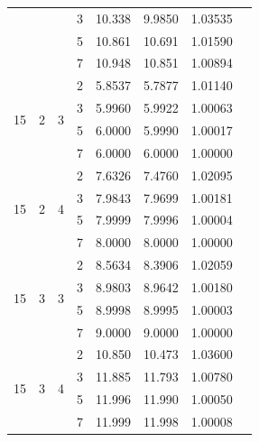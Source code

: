 \documentclass[a4paper,11pt,reqno]{article}
\theoremstyle{plain} \numberwithin{equation}{section}
\theoremstyle{definition}
\begin{document}
\begin{appendices}
\begin{table}[!ht]
\begin{tabular}{|c|c|c|c|c|c|c|c|}
                    &                    &                    & 3   & 10.338 & 9.9850 & 1.03535 \\
                    &                    &                    & 5   & 10.861 & 10.691 & 1.01590 \\
                    &                    &                    & 7   & 10.948 & 10.851 & 1.00894 \\
\hline
\multirow{4}{*}{15} & \multirow{4}{*}{2} & \multirow{4}{*}{3} & 2   & 5.8537 & 5.7877 & 1.01140 \\
                    &                    &                    & 3   & 5.9960 & 5.9922 & 1.00063 \\
                    &                    &                    & 5   & 6.0000 & 5.9990 & 1.00017 \\
                    &                    &                    & 7   & 6.0000 & 6.0000 & 1.00000 \\
\hline
\multirow{4}{*}{15} & \multirow{4}{*}{2} & \multirow{4}{*}{4} & 2   & 7.6326 & 7.4760 & 1.02095 \\
                    &                    &                    & 3   & 7.9843 & 7.9699 & 1.00181 \\
                    &                    &                    & 5   & 7.9999 & 7.9996 & 1.00004 \\
                    &                    &                    & 7   & 8.0000 & 8.0000 & 1.00000 \\
\hline
\multirow{4}{*}{15} & \multirow{4}{*}{3} & \multirow{4}{*}{3} & 2   & 8.5634 & 8.3906 & 1.02059 \\
                    &                    &                    & 3   & 8.9803 & 8.9642 & 1.00180 \\
                    &                    &                    & 5   & 8.9998 & 8.9995 & 1.00003 \\
                    &                    &                    & 7   & 9.0000 & 9.0000 & 1.00000 \\
\hline
\multirow{4}{*}{15} & \multirow{4}{*}{3} & \multirow{4}{*}{4} & 2   & 10.850 & 10.473 & 1.03600 \\
                    &                    &                    & 3   & 11.885 & 11.793 & 1.00780 \\
                    &                    &                    & 5   & 11.996 & 11.990 & 1.00050 \\
                    &                    &                    & 7   & 11.999 & 11.998 & 1.00008 \\
\hline
\end{tabular}
\end{table}




\end{appendices}
\end{document}
